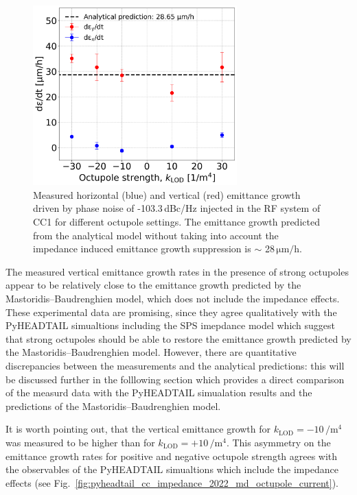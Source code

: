 \begin{figure}[!h]
   \centering         
   \includegraphics[width=0.7\textwidth]{images/Ch8/emit_H_and_V_octupole_scan_background_growth_subtracted_exp3_sep22.png}
       \caption{Measured horizontal (blue) and vertical (red) emittance growth driven by phase noise of -103.3\,dBc/Hz injected in the RF system of CC1 for different octupole settings. The emittance growth predicted from the analytical model without taking into account the impedance induced emittance growth suppression is $\sim$ 28\,$\mathrm{\mu m/h}$.}
       \label{fig:H_V_emit_growth_background_subtracted_octupole_scan_sep22}
\end{figure}

The measured vertical emittance growth rates in the presence of strong octupoles appear to be relatively close to the emittance growth predicted by the Mastoridis--Baudrenghien model, which does not include the impedance effects. These experimental data are promising, since they agree qualitatively with the PyHEADTAIL simualtions including the SPS imepdance model which suggest that strong octupoles should be able to restore the emittance growth predicted by the Mastoridis--Baudrenghien model. However, there are quantitative discrepancies between the measurements and the analytical predictions: this will be discussed further in the folllowing section which provides a direct comparison of the measurd data with the PyHEADTAIL simualation results and the predictions of the Mastoridis--Baudrenghien model.

It is worth pointing out, that the vertical emittance growth for $k_\mathrm{LOD}=-10$\,$\mathrm{/m^4}$ was measured to be higher than for $k_\mathrm{LOD}=+10$\,$\mathrm{/m^4}$. This asymmetry on the emittance growth rates for positive and negative octupole strength agrees with the observables of the PyHEADTAIL simualtions which include the impedance effects (see Fig.~\ref{fig:pyheadtail_cc_impedance_2022_md_octupole_current}).

